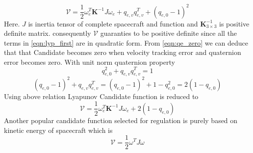 \begin{equation}
\mathcal{V} =\frac{1}{2} \omega ^{T}_{e}\mathbf{K}^{-1} J\omega _{e} +q_{e,v} q^{T}_{e,v} +( q_{e,0} -1)^{2}
\label{eqn:lyp_first}
\end{equation}
Here. $\displaystyle J$ is inertia tensor of complete spacecraft and function and $\displaystyle \mathbf{K}^{-1}_{3\times 3}$ is positive definite matrix. consequently $\displaystyle \mathcal{V}$ guaranties to be positive definite since all the terms in \autoref{eqn:lyp_first} are in quadratic form. From \autoref{eqn:qe_zero} we can deduce that that Candidate becomes zero when velocity tracking error and quaternion error becomes zero. With unit norm quaternion property
\begin{equation}
q^{2}_{e,0} +q_{e,v} q^{T}_{e,v} =1
\end{equation}
\begin{equation}
( q_{e,0} -1)^{2} +q_{e,v} q^{T}_{e,v} =( q_{e,0} -1)^{2} +1-q^{2}_{e,0} =2( 1-q_{e,0})
\label{eqn:unit_norm_quat_rearanged}
\end{equation}
Using above relation Lyapunov Candidate function is reduced to
\begin{equation}
\mathcal{V} =\frac{1}{2} \omega ^{T}_{e}\mathbf{K}^{-1} J\omega _{e} +2( 1-q_{e,0})
\label{eqn:lyp_first_reduced}
\end{equation}
Another popular candidate function selected for regulation is purely based on kinetic energy of spacecraft which is
\begin{equation}
\mathcal{V} =\frac{1}{2} \omega ^{T} J\omega 
\end{equation}

